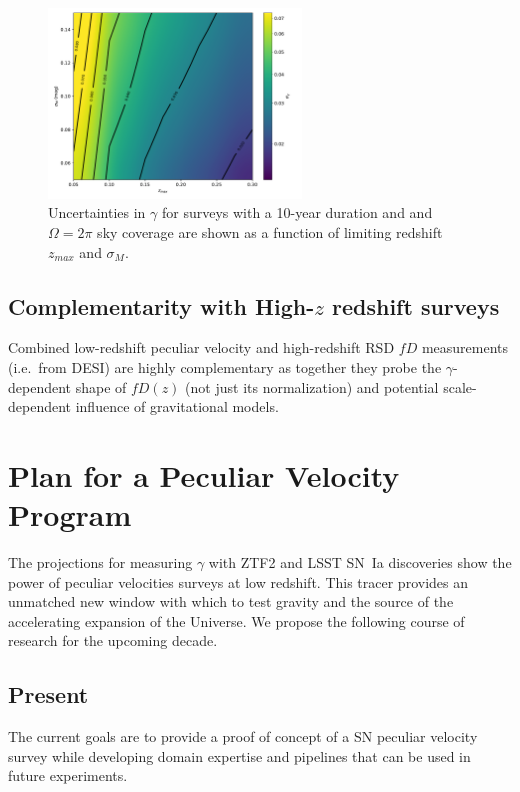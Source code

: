 \documentclass[11pt, oneside]{article}   	%
\begin{document}
\begin{figure}
\centering
\includegraphics[width=0.6\textwidth]{src/surface2.pdf}
\caption{Uncertainties in $\gamma$ for surveys with a 10-year duration and  and $\Omega=2\pi$ sky coverage 
are shown as a function of limiting  redshift $z_{max}$ and $\sigma_M$.
\label{lsst:fig}}
\end{figure}

\subsection{Complementarity with High-$z$ redshift surveys}
Combined low-redshift peculiar velocity and high-redshift RSD $fD$ measurements (i.e.\ from DESI) are highly complementary as together they probe the
$\gamma$-dependent shape of $fD(z)$ (not just its normalization) and potential scale-dependent influence of gravitational models.  

\section{Plan for a Peculiar Velocity Program}
The projections for measuring $\gamma$ with ZTF2 and LSST SN~Ia discoveries
show the power of peculiar velocities surveys at low redshift.
This  tracer provides an unmatched  new window with which to test gravity and the source of the accelerating expansion of the Universe.
We propose the following course of research for the upcoming decade.

\subsection{Present}
The current goals are to provide a proof of concept of a SN peculiar velocity survey while developing domain
expertise and pipelines that can be used in future experiments.
\end{document}
